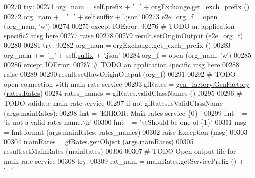 \begin{DoxyCode}
{00270         \textcolor{keywordflow}{try}:
00271             org\_nam  =  self.\hyperlink{classe2e_1_1_application_a027ff25e5409ae17584978a09fc2611a}{prefix} + \textcolor{stringliteral}{'\_'} + orgExchange.get\_exch\_prefix ()
00272             org\_nam += \textcolor{stringliteral}{'\_'} + self.\hyperlink{classe2e_1_1_application_a4d824ad36b051d2d629edb314385df0d}{suffix} + \textcolor{stringliteral}{'.json'}
00273             e2e\_org\_f = open (org\_nam, \textcolor{stringliteral}{'w'})
00274             
00275         \textcolor{keywordflow}{except} IOError:
00276             \textcolor{comment}{# TODO an application specific2 msg here}
00277             \textcolor{keywordflow}{raise}
00278 
00279         result.setOriginOutput (e2e\_org\_f)
00280             
00281         \textcolor{keywordflow}{try}:
00282             org\_nam  = orgExchange.get\_exch\_prefix ()
00283             org\_nam += \textcolor{stringliteral}{'\_'} + self.\hyperlink{classe2e_1_1_application_a4d824ad36b051d2d629edb314385df0d}{suffix} + \textcolor{stringliteral}{'.json'}
00284             org\_f = open (org\_nam, \textcolor{stringliteral}{'w'})
00285             
00286         \textcolor{keywordflow}{except} IOError:
00287             \textcolor{comment}{# TODO an application specific msg here}
00288             \textcolor{keywordflow}{raise}
00289             
00290         result.setRawOriginOutput (org\_f)
00291             
00292         \textcolor{comment}{# TODO open connection with main rate service}
00293         gfRates = \hyperlink{classgen__factory_1_1_gen_factory}{gen\_factory.GenFactory} (\hyperlink{classrates_1_1_rates}{rates.Rates})
00294         rates\_names = gfRates.validClassNames ()
00295 
00296         \textcolor{comment}{# TODO validate main rate service}
00297         \textcolor{keywordflow}{if} \textcolor{keywordflow}{not} gfRates.isValidClassName (args.mainRates):
00298             fmt  = \textcolor{stringliteral}{'ERROR: Main rates service \{0\} '}
00299             fmt += \textcolor{stringliteral}{'is not a valid rates name.\(\backslash\)n'}
00300             fmt += \textcolor{stringliteral}{'\(\backslash\)tShould be one of \{1\}'}
00301             msg = fmt.format (args.mainRates, rates\_names)
00302             \textcolor{keywordflow}{raise} Exception (msg)
00303 
00304         mainRates = gfRates.genObject (args.mainRates)
00305         result.setMainRates (mainRates)
00306         
00307         \textcolor{comment}{# TODO Open output file for main rate service}
00308         \textcolor{keywordflow}{try}:
00309             rat\_nam  =  mainRates.getServicePrefix () + \textcolor{stringliteral}{'\_'}
}
\end{DoxyCode}
